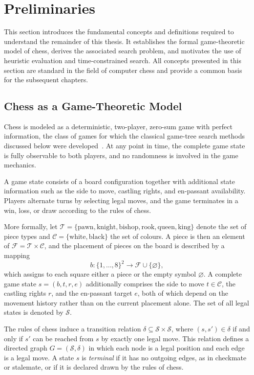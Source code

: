 \section{Preliminaries}
\label{sec:preliminaries}

This section introduces the fundamental concepts and definitions required to
understand the remainder of this thesis. It establishes the formal game-theoretic
model of chess, derives the associated search problem, and motivates the use of
heuristic evaluation and time-constrained search. All concepts presented in this
section are standard in the field of computer chess and provide a common basis
for the subsequent chapters.

\subsection{Chess as a Game-Theoretic Model}

Chess is modeled as a deterministic, two-player, zero-sum game with perfect
information, the class of games for which the classical game-tree search methods
discussed below were developed~\cite{yannakakis2018artificial}. At any point in
time, the complete game state is fully observable to both players, and no
randomness is involved in the game mechanics.

A game state consists of a board configuration together with additional state
information such as the side to move, castling rights, and en-passant
availability. Players alternate turns by selecting legal moves, and the game
terminates in a win, loss, or draw according to the rules of chess.

More formally, let $\mathcal{T} = \{\text{pawn}, \text{knight}, \text{bishop},
\text{rook}, \text{queen}, \text{king}\}$ denote the set of piece types and
$\mathcal{C} = \{\text{white}, \text{black}\}$ the set of colours. A piece is then
an element of $\mathcal{F} = \mathcal{T} \times \mathcal{C}$, and the placement of
pieces on the board is described by a mapping
\[
b : \{1, \dots, 8\}^2 \rightarrow \mathcal{F} \cup \{\varnothing\},
\]
which assigns to each square either a piece or the empty symbol $\varnothing$. A
complete game state $s = (b, t, r, e)$ additionally comprises the side to move
$t \in \mathcal{C}$, the castling rights $r$, and the en-passant target $e$, both
of which depend on the movement history rather than on the current placement
alone. The set of all legal states is denoted by $\mathcal{S}$.

The rules of chess induce a transition relation
$\delta \subseteq \mathcal{S} \times \mathcal{S}$, where $(s, s') \in \delta$ if
and only if $s'$ can be reached from $s$ by exactly one legal move. This relation
defines a directed graph $G = (\mathcal{S}, \delta)$ in which each node is a legal
position and each edge is a legal move. A state $s$ is \emph{terminal} if it has
no outgoing edges, as in checkmate or stalemate, or if it is declared drawn by
the rules of chess.

